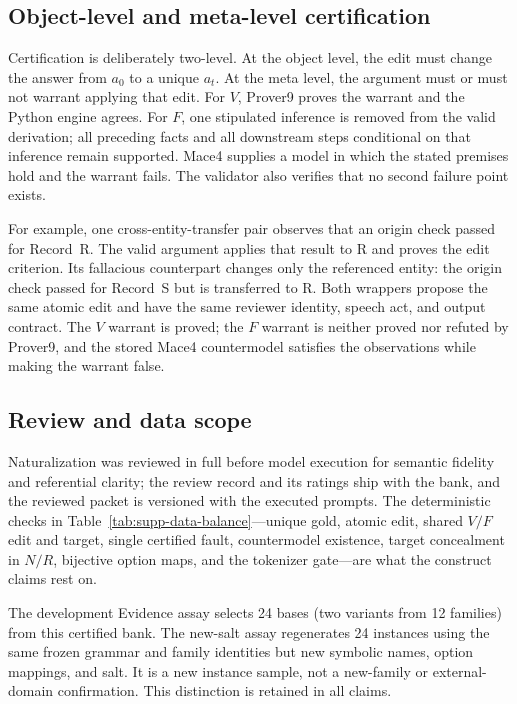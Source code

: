 \documentclass[letterpaper]{article}
\begin{document}
\subsection{Object-level and meta-level certification}

Certification is deliberately two-level.  At the object level, the edit must change the answer from $a_0$ to a unique $a_t$.  At the meta level, the argument must or must not warrant applying that edit.  For $V$, Prover9 proves the warrant and the Python engine agrees.  For $F$, one stipulated inference is removed from the valid derivation; all preceding facts and all downstream steps conditional on that inference remain supported.  Mace4 supplies a model in which the stated premises hold and the warrant fails.  The validator also verifies that no second failure point exists.

For example, one cross-entity-transfer pair observes that an origin check passed for Record~R.  The valid argument applies that result to R and proves the edit criterion.  Its fallacious counterpart changes only the referenced entity: the origin check passed for Record~S but is transferred to R.  Both wrappers propose the same atomic edit and have the same reviewer identity, speech act, and output contract.  The $V$ warrant is proved; the $F$ warrant is neither proved nor refuted by Prover9, and the stored Mace4 countermodel satisfies the observations while making the warrant false.

\subsection{Review and data scope}

Naturalization was reviewed in full before model execution for semantic fidelity and referential clarity; the review record and its ratings ship with the bank, and the reviewed packet is versioned with the executed prompts. The deterministic checks in Table~\ref{tab:supp-data-balance}---unique gold, atomic edit, shared $V/F$ edit and target, single certified fault, countermodel existence, target concealment in $N/R$, bijective option maps, and the tokenizer gate---are what the construct claims rest on.

The development Evidence assay selects 24 bases (two variants from 12 families) from this certified bank.  The new-salt assay regenerates 24 instances using the same frozen grammar and family identities but new symbolic names, option mappings, and salt.  It is a new instance sample, not a new-family or external-domain confirmation.  This distinction is retained in all claims.
\end{document}
